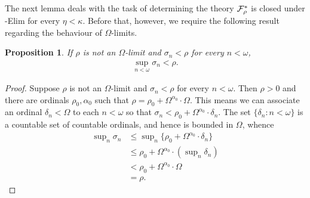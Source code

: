 \documentclass[UKenglish,cleveref,DIV=12]{scrartcl}
\newtheorem{proposition}[lemma]{Proposition}
\theoremstyle{definition}
\theoremstyle{definition}
\begin{document}
%
%

The next lemma deals with the task of determining the theory $\mathcal{F}^*_\rho$ is
closed under \textT\eta-Elim for every $\eta<\kappa$. Before that, however, we require the following result regarding the behaviour of $\Omega$-limits.
\begin{proposition}\label{extlem:ordOlimit}
 If $\rho$ is not an $\Omega$-limit and $\sigma_n<\rho$ for every $n<\omega$,
 \begin{align*}
  \sup_{n<\omega}\sigma_n<\rho.
 \end{align*}
\end{proposition}
\begin{proof}
Suppose $\rho$ is not an $\Omega$-limit and $\sigma_n<\rho$ for every $n<\omega$.
Then $\rho>0$ and there are ordinals $\rho_0,\alpha_0$ such that
$\rho=\rho_0+\Omega^{\alpha_0}\cdot\Omega$. This means we can associate an
ordinal $\delta_n<\Omega$ to each $n<\omega$ so that
$\sigma_n<\rho_0+\Omega^{\alpha_0}\cdot\delta_n$. The set
$\{\delta_n:n<\omega\}$ is a countable set of countable ordinals, and hence is
bounded in $\Omega$, whence
\begin{align*}
\sup\nolimits_{n}\sigma_n&\le\sup\nolimits_{n}\{\rho_0+\Omega^{\alpha_0}\cdot\delta_n\}\\
  &\le \rho_0+\Omega^{\alpha_0}\cdot(\sup\nolimits_{n}\delta_n)\\
  &<\rho_0+\Omega^{\alpha_0}\cdot\Omega\\
  &=\rho.
\end{align*}
\end{proof}
\end{document}
